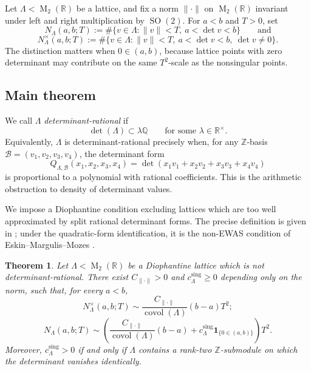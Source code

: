 \documentclass[reqno,11pt]{amsart}
\newtheorem{theorem}{Theorem}[section]
\theoremstyle{definition}
\theoremstyle{remark}
\numberwithin{equation}{section}
\newcommand{\M}{\operatorname{M}}
\newcommand{\SO}{\operatorname{SO}}
\newcommand{\covol}{\operatorname{covol}}
\begin{document}
Let $\Lambda<\M_2(\mathbb R)$ be a lattice, and fix a norm
$\|\cdot\|$ on $\M_2(\mathbb R)$ invariant under left and right
multiplication by $\SO(2)$. For $a<b$ and $T>0$, set
$$
N_\Lambda(a,b;T)
:=
\#\{v\in\Lambda:\|v\|<T,\ a<\det v<b\}\qquad\text{and}
$$
$$
N_\Lambda^\times(a,b;T)
:=
\#\{v\in\Lambda:\|v\|<T,\ a<\det v<b,\ \det v\ne0\}.
$$
The distinction matters when $0\in(a,b)$, because lattice points with zero
determinant may contribute on the same $T^2$-scale as the nonsingular
points.

\subsection*{Main theorem}

We call $\Lambda$ \emph{determinant-rational} if
$$
\det(\Lambda)\subset \lambda\mathbb Q
\qquad\text{for some }\lambda\in\mathbb R^\times.
$$ 
Equivalently, $\Lambda$ is determinant-rational precisely when, for any $\mathbb Z$-basis $\mathcal B=(v_1,v_2, v_3,v_4)$, the determinant form
\begin{equation}\label{eq:FLambdadef}
Q_{\Lambda,\mathcal B}(x_1,x_2, x_3,x_4)=\det(x_1v_1+x_2v_2+x_3v_3+x_4v_4)
\end{equation}
is proportional to a polynomial with rational coefficients. This is the arithmetic obstruction to density of determinant values.

We impose a Diophantine condition excluding lattices which are too well
approximated by split rational determinant forms. The precise definition is
given in ; under the quadratic-form identification, it
is the non-EWAS condition of Eskin--Margulis--Mozes \cite{eskin-margulis-mozes:2005}.

\begin{theorem}\label{thm:main}
Let $\Lambda<\M_2(\mathbb R)$ be a Diophantine lattice which is not
determinant-rational. There exist
$C_{\|\cdot\|}>0$ and $c_{\Lambda}^{\operatorname{sing}}\ge 0$ depending only on the norm, such that, for every
$a<b$,
\begin{equation}\label{eq:main-nonsingular}
N_\Lambda^\times(a,b;T)
\sim
\frac{C_{\|\cdot\|}}{\covol(\Lambda)}(b-a)T^2;
\end{equation}
\begin{equation}\label{eq:main-full}
N_\Lambda(a,b;T)
\sim
\left(
\frac{C_{\|\cdot\|}}{\covol(\Lambda)}(b-a)
+
c_\Lambda^{\operatorname{sing}}\mathbf 1_{\{0\in(a,b)\}}
\right)T^2.
\end{equation}
Moreover, $c_\Lambda^{\operatorname{sing}}>0$ if and only if $\Lambda$ contains
a rank-two $\mathbb Z$-submodule on which the determinant vanishes identically.
\end{theorem}
\end{document}
